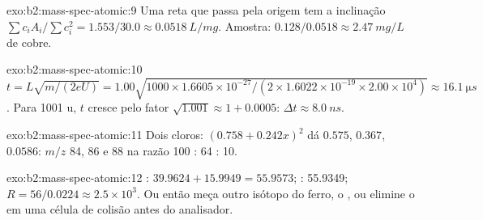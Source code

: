 \begin{solution}{exo:b2:mass-spec-atomic:9}
Uma reta que passa pela origem tem a inclinação $\sum c_iA_i/\sum c_i^2 = 1.553/30.0 \approx \qty{0.0518}{L/mg}$. Amostra:
$0.128/0.0518 \approx \qty{2.47}{mg/L}$ de cobre.
\end{solution}

\begin{solution}{exo:b2:mass-spec-atomic:10}
$t = L\sqrt{m/(2eU)} = 1.00\sqrt{1000 \times 1.6605 \times 10^{-27}/(2 \times 1.6022 \times 10^{-19}
\times 2.00 \times 10^4)} \approx \qty{16.1}{\micro s}$. Para 1001 u, $t$ cresce pelo fator
$\sqrt{1.001} \approx 1 + 0.0005$: $\Delta t \approx \qty{8.0}{ns}$.
\end{solution}

\begin{solution}{exo:b2:mass-spec-atomic:11}
Dois cloros: $(0.758 + 0.242x)^2$ dá $0.575$, $0.367$, $0.0586$: $m/z$ 84, 86 e 88 na razão
100 : 64 : 10.
\end{solution}

\begin{solution}{exo:b2:mass-spec-atomic:12}
: $39.9624 + 15.9949 = 55.9573$; : 55.9349; $R = 56/0.0224 \approx 2.5 \times
10^3$. Ou então meça outro isótopo do ferro, o , ou elimine o  em uma célula de
colisão antes do analisador.
\end{solution}

